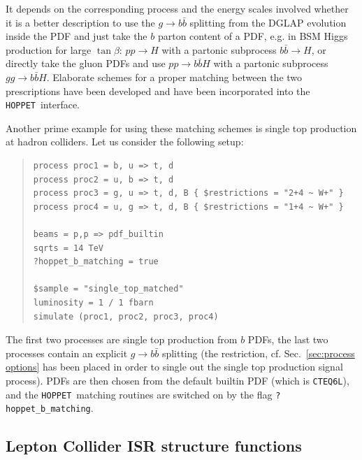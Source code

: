 \documentclass[12pt]{book}
\newcommand{\ttt}[1]{\texttt{#1}}
\newcommand{\hoppet}{\ttt{HOPPET}}
\begin{document}
It depends on the corresponding process and the energy scales involved
whether it is a better description to use the
$g\to b\bar b$ splitting from the DGLAP evolution inside the PDF and
just take the $b$ parton content of a PDF, e.g. in BSM Higgs
production for large $\tan\beta$: $pp \to H$ with a partonic
subprocess $b\bar b \to H$, or directly take the gluon PDFs and use
$pp \to b\bar b H$ with a partonic subprocess $gg \to b \bar b
H$. Elaborate schemes for a proper matching between the two
prescriptions have been developed and have been incorporated into the
\hoppet\ interface.

Another prime example for using these matching schemes is single top
production at hadron colliders. Let us consider the following setup:
\begin{quote}
\begin{footnotesize}
\begin{Verbatim}
process proc1 = b, u => t, d
process proc2 = u, b => t, d
process proc3 = g, u => t, d, B	{ $restrictions = "2+4 ~ W+" }
process proc4 = u, g => t, d, B	{ $restrictions = "1+4 ~ W+" }

beams = p,p => pdf_builtin
sqrts = 14 TeV
?hoppet_b_matching = true

$sample = "single_top_matched"
luminosity = 1 / 1 fbarn
simulate (proc1, proc2, proc3, proc4)
\end{Verbatim}
\end{footnotesize}%
\end{quote}
The first two processes are single top production from $b$ PDFs, the
last two processes contain an explicit $g\to b\bar b$ splitting (the
restriction, cf. Sec.~\ref{sec:process options} has been placed in
order to single out the single top production signal process). PDFs
are then chosen from the default builtin PDF (which is \ttt{CTEQ6L}),
and the \hoppet\ matching routines are switched on by the flag
\ttt{?hoppet\_b\_matching}.


\subsection{Lepton Collider ISR structure functions}
\label{sec:lepton_isr}
\end{document}
